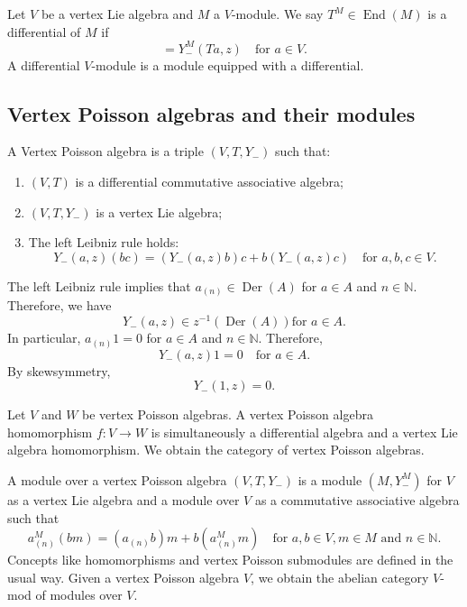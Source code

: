 \documentclass[a4paper, 12pt, reqno]{amsart}
\theoremstyle{remark}
\numberwithin{equation}{subsection}
\DeclareMathOperator{\End}{End}
\DeclareMathOperator{\Der}{Der}
\begin{document}
Let $V$ be a vertex Lie algebra and $M$ a $V$-module.
We say $T^M \in \End(M)$ is a differential of $M$ if
\begin{equation*}
  [T^M, Y^M_-(a, z)] = Y^M_-(Ta, z) \quad \text{for }a \in V.
\end{equation*}
A differential $V$-module is a module equipped with a differential.

\subsection{Vertex Poisson algebras and their modules}
\label{sec:vert-poiss-algebr}

A Vertex Poisson algebra is a triple $(V, T, Y_-)$ such that:
\begin{enumerate}
\item $(V, T)$ is a differential commutative associative algebra;
\item $(V, T, Y_-)$ is a vertex Lie algebra;
\item The left Leibniz rule holds:
  \begin{equation*}
    Y_-(a, z)(bc) = (Y_-(a, z)b)c + b(Y_-(a, z)c) \quad \text{for }a, b, c \in V.
  \end{equation*}
\end{enumerate}
The left Leibniz rule implies that $a_{(n)} \in \Der(A)$ for $a \in A$ and $n \in \mathbb{N}$.
Therefore, we have
\begin{equation*}
  Y_-(a, z) \in z^{-1}(\Der(A)) \text{for }a \in A.
\end{equation*}
In particular, $a_{(n)}1 = 0$ for $a \in A$ and $n\in \mathbb{N}$.
Therefore,
\begin{equation*}
  Y_-(a, z)1 = 0 \quad \text{for } a \in A.
\end{equation*}
By skewsymmetry, 
\begin{equation*}
  Y_-(1,z)=0.
\end{equation*}

Let $V$ and $W$ be vertex Poisson algebras.
A vertex Poisson algebra homomorphism $f: V \to W$ is simultaneously a differential algebra and a vertex Lie algebra homomorphism.
We obtain the category of vertex Poisson algebras.

A module over a vertex Poisson algebra $(V, T, Y_-)$ is a module $(M, Y^M_-)$ for $V$ as a vertex Lie algebra and a module over $V$ as a commutative associative algebra such that
\begin{equation*}
  a^M_{(n)}(bm) = (a_{(n)}b)m+b(a^M_{(n)}m) \quad \text{for }a, b \in V, m \in M\text{ and }n \in \mathbb{N}.
\end{equation*}
Concepts like homomorphisms and vertex Poisson submodules are defined in the usual way.
Given a vertex Poisson algebra $V$, we obtain the abelian category $V$-mod of modules over $V$.
\end{document}
